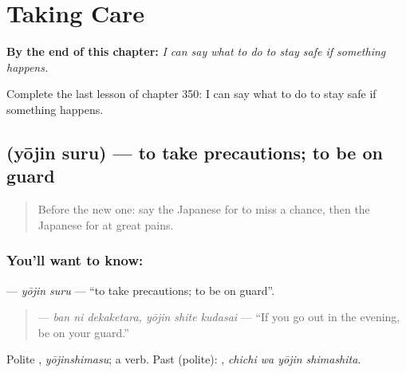 
\chapter{Taking Care}
\label{ch:ja-taking-care}

\begin{chapteropening}
\textbf{By the end of this chapter:} \emph{I can say what to do to stay safe if something happens.}

Complete the last lesson of chapter 350: I can say what to do to stay safe if something happens.
\end{chapteropening}

\section[\texorpdfstring{\ja{ようじんする} (yōjin suru)}{ようじんする (yōjin suru)}]{ (yōjin suru) — to take precautions; to be on guard}

\label{lesson:JA-C350-youjin-suru}



\begin{quote}
Before the new one: say the Japanese for to miss a chance, then the Japanese for at great pains.
\end{quote}

\subsection*{You'll want to know: }
\textbf{} — \emph{yōjin suru} — \textquotedblleft{}to take precautions; to be on guard\textquotedblright{}.

\begin{quote}
\textbf{  } — \emph{ban ni dekaketara, yōjin shite kudasai} — \textquotedblleft{}If you go out in the evening, be on your guard.\textquotedblright{}
\end{quote}

Polite \textbf{}, \emph{yōjinshimasu}; a  verb. Past (polite): \textbf{ }, \emph{chichi wa yōjin shimashita}.

